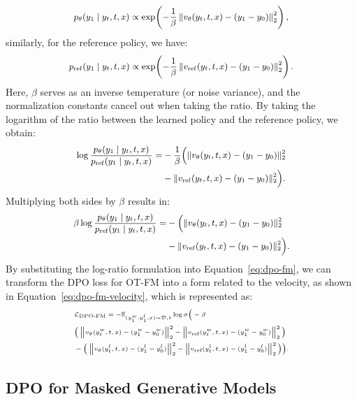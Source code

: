 \documentclass[11pt]{article}
\begin{document}
\[
{\small
\begin{aligned}
p_\theta(y_1 \mid y_t, t, x) \propto \exp\!\left(-\frac{1}{\beta}\left\|v_\theta(y_t,t,x) - (y_1-y_0)\right\|_2^2\right),
\end{aligned}
}
\]
similarly, for the reference policy, we have:
\[
{\small
\begin{aligned}
p_{\mathrm{ref}}(y_1 \mid y_t, t, x) \propto \exp\!\left(-\frac{1}{\beta}\left\|v_{\mathrm{ref}}(y_t,t,x) - (y_1-y_0)\right\|_2^2\right).
\end{aligned}
}
\]
Here, \(\beta\) serves as an inverse temperature (or noise variance), and the normalization constants cancel out when taking the ratio.
By taking the logarithm of the ratio between the learned policy and the reference policy, we obtain:
\[
{\small
\begin{aligned}
\log\frac{p_\theta(y_1\mid y_t,t,x)}{p_{\mathrm{ref}}(y_1\mid y_t,t,x)} = & -\frac{1}{\beta} \Bigl( \|v_\theta(y_t,t,x) - (y_1-y_0)\|_2^2 \\
& - \|v_{\mathrm{ref}}(y_t,t,x) - (y_1-y_0)\|_2^2\Bigr).
\end{aligned}
}
\]
Multiplying both sides by \(\beta\) results in:
\[
{\small
\begin{aligned}
\beta\log\frac{p_\theta(y_1\mid y_t,t,x)}{p_{\mathrm{ref}}(y_1\mid y_t,t,x)} = & -\Bigl( \|v_\theta(y_t,t,x) - (y_1-y_0)\|_2^2 \\
& - \|v_{\mathrm{ref}}(y_t,t,x) - (y_1-y_0)\|_2^2 \Bigr).
\end{aligned}
}
\]
By substituting the log-ratio formulation into Equation~\ref{eq:dpo-fm}, we can transform the DPO loss for OT-FM into a form related to the velocity, as shown in Equation~\ref{eq:dpo-fm-velocity}, which is represented as:
\[
{\tiny
\begin{aligned}
& \mathcal{L}_{\text{DPO-FM}} = -\mathbb{E}_{(y_1^w, y_1^l, x) \sim \mathcal{D}, t} \log \sigma \Big( -\beta \\
& \Big( \left\| v_\theta(y^w_t, t, x) - (y_1^w - y_0^w) \right\|_2^2
- \left\| v_\text{ref}(y^w_t, t, x) - (y_1^w - y_0^w) \right\|_2^2 \Big) \\
& - \Big( \left\| v_\theta(y^l_t, t, x) - (y_1^l - y_0^l) \right\|_2^2
- \left\| v_\text{ref}(y^l_t, t, x) - (y_1^l -y_0^l) \right\|_2^2 \Big) \Big).
\end{aligned}
}
\]

\subsection{DPO for Masked Generative Models}\label{sec:appendix-derivation-mgm}
\end{document}
